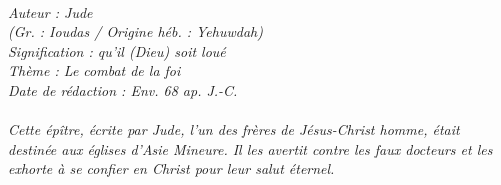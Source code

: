 \BFont
\noindent\hrulefill
{\footnotesize
\textit{
\bigskip
{\centering{}
\\Auteur : Jude
\\(Gr. :  Ioudas / Origine héb. : Yehuwdah)
\\Signification : qu'il (Dieu) soit loué
\\Thème : Le combat de la foi
\\Date de rédaction : Env. 68 ap. J.-C.\\}
}
\textit{
\\Cette épître, écrite par Jude, l'un des frères de Jésus-Christ homme, était destinée aux églises d'Asie Mineure. Il les avertit contre les faux docteurs et les exhorte à se confier en Christ pour leur salut éternel.\bigskip
}
}
\par\nobreak\noindent\hrulefill
